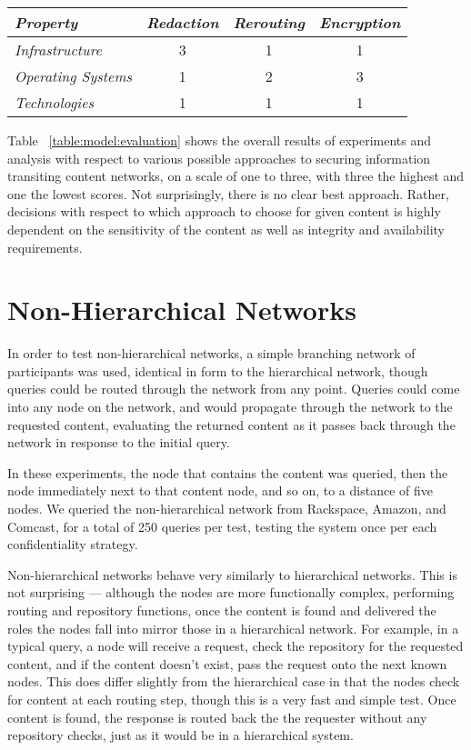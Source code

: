 \begin{table*}[tp] %
\centering %
\begin{tabular}{lccc}
\toprule %
{\it Property}			& {\it Redaction}	& {\it Rerouting} 	& {\it Encryption} 	\\\toprule
{\it Infrastructure} 	& 3				  	& 1					& 1				 	\\\midrule
{\it Operating Systems}	& 1					& 2					& 3 					\\\midrule
{\it Technologies}		& 1					& 1					& 1					\\\bottomrule
\end{tabular}
\caption{Approach Evaluation Summary}
\label{table:model:evaluation}
\end{table*}

Table ~\ref{table:model:evaluation} shows the overall results of experiments and analysis with respect to various possible approaches to securing information transiting content networks, on a scale of one to three, with three the highest and one the lowest scores.  Not surprisingly, there is no clear best approach.  Rather, decisions with respect to which approach to choose for given content is highly dependent on the sensitivity of the content as well as integrity and availability requirements.

\section{Non-Hierarchical Networks}
In order to test non-hierarchical networks, a simple branching network of participants was used, identical in form to the hierarchical network, though queries could be routed through the network from any point.  Queries could come into any node on the network, and would propagate through the network to the requested content, evaluating the returned content as it passes back through the network in response to the initial query.

In these experiments, the node that contains the content was queried, then the node immediately next to that content node, and so on, to a distance of five nodes.  We queried the non-hierarchical network from Rackspace, Amazon, and Comcast, for a total of 250 queries per test, testing the system once per each confidentiality strategy.

Non-hierarchical networks behave very similarly to hierarchical networks.  This is not surprising --- although the nodes are more functionally complex, performing routing and repository functions, once the content is found and delivered the roles the nodes fall into mirror those in a hierarchical network.  For example, in a typical query, a node will receive a request, check the repository for the requested content, and if the content doesn't exist, pass the request onto the next known nodes.  This does differ slightly from the hierarchical case in that the nodes check for content at each routing step, though this is a very fast and simple test.  Once content is found, the response is routed back the the requester without any repository checks, just as it would be in a hierarchical system.

